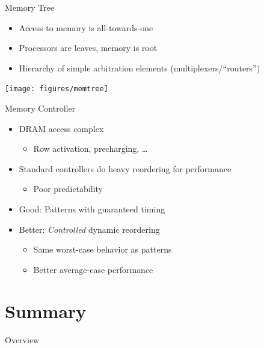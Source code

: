 \documentclass[17pt]{beamer}
\begin{document}
\begin{frame}{Memory Tree}
  \begin{itemize}
  \item Access to memory is all-towards-one
  \item Processors are leaves, memory is root
  \item Hierarchy of simple arbitration elements (multiplexers/``routers'')
  \end{itemize}
  \begin{center}
  \texttt{[image: figures/memtree]}    
  \end{center}
\end{frame}

\begin{frame}{Memory Controller}
  \begin{itemize}
  \item DRAM access complex
    \begin{itemize}
    \item Row activation, precharging, \dots
    \end{itemize}
  \item Standard controllers do heavy reordering for performance
    \begin{itemize}
    \item Poor predictability
    \end{itemize}
  \item Good: Patterns with guaranteed timing
  \item Better: \emph{Controlled} dynamic reordering
    \begin{itemize}
    \item Same worst-case behavior as patterns
    \item Better average-case performance
    \end{itemize}
  \end{itemize}
\end{frame}

\section{Summary}

\begin{frame}{Overview}
  \tableofcontents[currentsection]
\end{frame}
\end{document}
